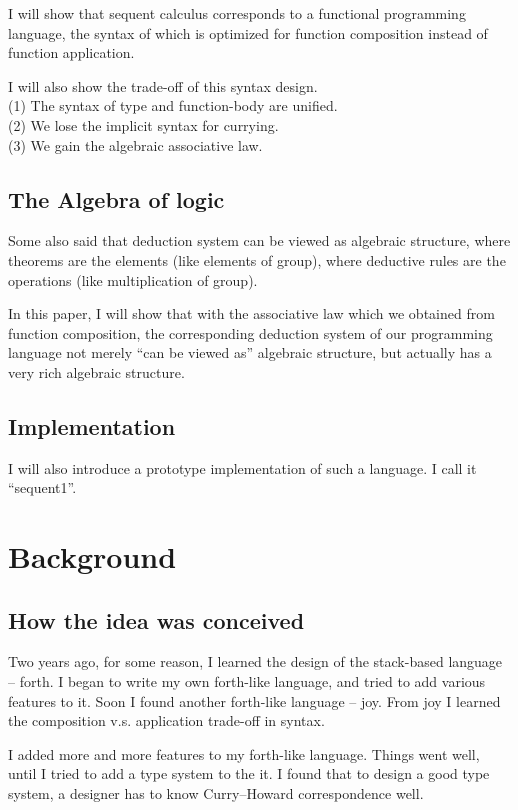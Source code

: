 \documentclass[numbers]{sigplanconf}
\begin{document}
I will show that
sequent calculus corresponds to a functional programming language,
the syntax of which is optimized for function composition
instead of function application.

I will also show the trade-off of this syntax design. \\
(1) The syntax of type and function-body are unified. \\
(2) We lose the implicit syntax for currying. \\
(3) We gain the algebraic associative law.

\subsection{The Algebra of logic}

Some also said that
deduction system can be viewed as algebraic structure,
where theorems are the elements (like elements of group),
where deductive rules are the operations (like multiplication of group). \cite{Hott}

In this paper, I will show that
with the associative law which we obtained from function composition,
the corresponding deduction system of our programming language
not merely ``can be viewed as'' algebraic structure,
but actually has a very rich algebraic structure.

\subsection{Implementation}

I will also introduce a prototype implementation of such a language.
I call it ``sequent1''.

\section{Background}

\subsection{How the idea was conceived}

Two years ago,
for some reason, I learned the design of the stack-based language -- forth.
I began to write my own forth-like language,
and tried to add various features to it.
Soon I found another forth-like language -- joy.
From joy I learned the composition v.s. application trade-off in syntax.

I added more and more features to my forth-like language.
Things went well, until I tried to add a type system to the it.
I found that
to design a good type system,
a designer has to know Curry--Howard correspondence well.
\end{document}
